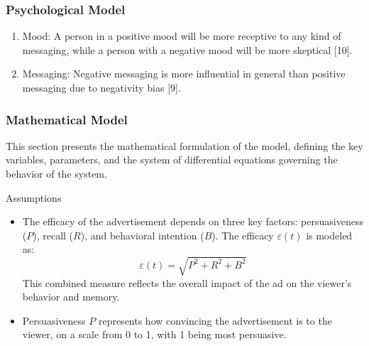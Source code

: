 \documentclass[12pt]{beamer}
\begin{document}
\begin{frame}
\frametitle{Psychological Model}
\begin{enumerate}
    \item Mood: A person in a positive mood will be more receptive to any kind of messaging, while a person with a negative mood will be more skeptical [10].
    \item Messaging: Negative messaging is more influential in general than positive messaging due to negativity bias [9].
\end{enumerate}

\end{frame}

\begin{frame}
\frametitle{Mathematical Model}
This section presents the mathematical formulation of the model, defining the key variables, parameters, and the system of differential equations governing the behavior of the system.


\begin{block}{Assumptions}
\begin{itemize}
    \item The efficacy of the advertisement depends on three key factors: persuasiveness (\( P \)), recall (\( R \)), and behavioral intention (\( B \)). The efficacy \( \varepsilon(t) \) is modeled as:
    \[
    \varepsilon(t) = \sqrt{P^2 + R^2 + B^2}
    \]
    This combined measure reflects the overall impact of the ad on the viewer's behavior and memory.
    \item Persuasiveness \( P \) represents how convincing the advertisement is to the viewer, on a scale from 0 to 1, with 1 being most persuasive.
\end{itemize}
\end{block}
\end{frame}
\end{document}
